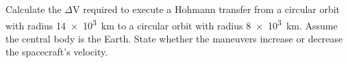\begin{hwkProblem}{3}{}

	Calculate the \( \Delta \mathrm{V} \) required to execute a Hohmann transfer from a circular orbit with radius \qty{14e3}{\km} to a circular orbit with radius \qty{8e3}{\km}. Assume the central body is the Earth. State whether the maneuvers increase or decrease the spacecraft's velocity.

	\hwkSol

\end{hwkProblem}

